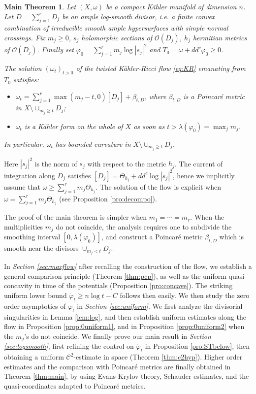 \documentclass[10pt,a4paper]{amsart}
\numberwithin{equation}{section}
\newtheorem*{thmM}{Main Theorem}
\newcommand{\f}{\varphi}
\newcommand \la {\lambda}
\begin{document}
 \begin{thmM} \label{thm:A}
 Let $(X,\omega)$ be a compact K\"ahler manifold of dimension $n$.
 Let $D=\sum_{j=1}^r D_j$ be an ample log-smooth divisor, i.e. a finite 
convex combination of irreducible smooth ample hypersurfaces with simple normal crossings.
Fix $m_j \geq 0$, $s_j$ holomorphic sections of ${\mathcal O}(D_j)$,
$h_j$ hermitian metrics of ${\mathcal O}(D_j)$. Finally set $\f_0=\sum_{j=1}^r m_j \log |s_j|^2$
and $T_0=\omega+dd^c \f_0 \geq 0$.

The solution $(\omega_t)_{t>0}$ of the twisted K\"ahler-Ricci flow  \eqref{eq:KR} emanating from $T_0$
satisfies:
   \begin{itemize}
   \item    $\omega_t= \sum_{j=1}^r \max(m_j-t,0)  [D_j] + 	\beta_{t,D}$,
   where $\beta_{t,D}$ is a  Poincaré metric in $X \setminus \cup_{m_j \geq t} D_j$;
   \item   $\omega_t$ is  a K\"ahler form on the whole of $X$ as soon as $t>\la(\f_0)=\max_j m_j$.
   \end{itemize}
   In particular, $\omega_t$ has bounded curvature in $X \setminus \cup_{m_j \geq t} D_j$.
 \end{thmM}


Here $|s_j|^2$ is the norm of $s_j$  with respect to the metric $h_j$. 
The current of integration along $D_j$ satisfies
$[D_j]=\Theta_{h_j}+dd^c \log |s_j|^2$, hence we implicitly assume that
$\omega \geq \sum_{j=1}^r m_j \Theta_{h_j}$.
The solution of the flow is explicit when $\omega = \sum_{j=1}^r m_j \Theta_{h_j}$ 
(see Proposition \ref{pro:decompo}).


The proof of the main theorem is simpler when $m_1=\cdots=m_r$.
When the multiplicities $m_j$ do not coincide, the analysis requires one to subdivide
the smoothing interval $[0,\la(\f_0)]$, and construct a Poincaré metric 
$\beta_{t,D}$ which is smooth near the divisors $\cup_{m_j < t} D_j$.
 

\smallskip
 
 In {\it Section \ref{sec:maxflow}}
 after recalling the construction of the flow,
 we  establish a general comparison principle (Theorem \ref{thm:pcp}),
 as well as the uniform quasi-concavity in time of the potentials (Proposition \ref{pro:concave}).
  The striking uniform lower bound 
 $\dot{\f}_t \geq n \log t -C$ follows then easily.
  We then study the zero order asymptotics of $\f_t$ in  {\it Section \ref{sec:uniform}}.
 We first analyze the divisorial singularities in Lemma \ref{lem:log}, and then establish 
 uniform estimates along the flow in Proposition \ref{prop:0uniform1}, and 
 in Proposition \ref{prop:0uniform2} when the $m_j$'s do not coincide.
  We finally prove our main result in {\it Section \ref{sec:logsmooth}}, first 
 refining the control on $\dot{\f}_t$ in Proposition \ref{pro:STbelow}, then
 obtaining a uniform ${\mathcal C}^2$-estimate in space (Theorem \ref{thm:c2hyp}).
Higher order estimates and
the comparison with Poincaré metrics are finally obtained in Theorem \ref{thm:main},
by using Evans-Krylov theory, Schauder estimates, and the quasi-coordinates adapted to Poincaré metrics.
 
\end{document}
